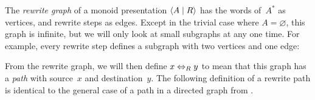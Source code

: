 \documentclass[../generics]{subfiles}
\begin{document}
\begin{definition}\label{rewrite graph def}
The \emph{rewrite graph} of a monoid presentation $\langle A \mid R\rangle$ has the words of~$A^*$ as vertices, and rewrite steps as edges. Except in the trivial case where $A=\varnothing$, this graph is infinite, but we will only look at small subgraphs at any one time. For example, every rewrite step defines a subgraph with two vertices and one edge:
\begin{center}
\end{center}
\end{definition}
From the rewrite graph, we will then define $x\Leftrightarrow_R y$ to mean that this graph has a \emph{path} with source~$x$ and destination~$y$. The following definition of a rewrite path is identical to the general case of a path in a directed graph from .
\end{document}
